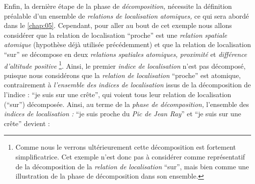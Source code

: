 Enfin, la dernière étape de la phase de \emph{décomposition,}
nécessite la définition préalable d'un ensemble de \emph{relations de
  localisation atomiques,} ce qui sera abordé dans le
\autoref{chap:05}. Cependant, pour aller au bout de cet exemple nous
allons considérer que la relation de localisation \enquote{proche} est
une \emph{relation spatiale atomique} (hypothèse déjà utilisée
précédemment) et que la relation de localisation \enquote{sur} se
décompose en deux \emph{relations spatiales atomiques,}
\emph{proximité} et \emph{différence d'altitude positive}
\footnote{Comme nous le verrons ultérieurement cette décomposition est
  fortement simplificatrice. Cet exemple n'est donc pas à considérer
  comme représentatif de la décomposition de la \emph{relation de
    localisation} \enquote{sur}, mais bien comme une illustration de
  la phase de décomposition dans son ensemble.}. Ainsi, le premier
\emph{indice de localisation} n'est pas décomposé, puisque nous
considérons que la \emph{relation de localisation} \enquote{proche}
est atomique, contrairement à \emph{l'ensemble des indices de
  localisation} issus de la décomposition de l'indice : \enquote{je
  suis sur une crête}, qui voient tous leur relation de localisation
(\enquote{sur}) décomposée. Ainsi, au terme de la \emph{phase de
  décomposition,} l'ensemble des \emph{indices de localisation :}
\enquote{je suis proche du \emph{Pic de Jean Ray}} et \enquote{je suis
  sur une crête} devient :

